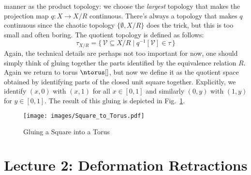 \documentclass[oneside]{book}                                                  %
\begin{document}
                manner as the product topology: we choose the \textit{largest}
                topology that makes the projection map $q:X\rightarrow{X}/R$
                continuous. There's always a topology that makes $q$ continuous
                since the chaotic topology $\{\emptyset,X/R\}$ does the trick,
                but this is too small and often boring. The quotient topology is
                defined as follows:
                \begin{equation}
                    \tau_{X/R}=\{\,\mathcal{V}\subseteq{X}/R\;|\;
                        q^{\minus{1}}[\mathcal{V}]\in\tau\,\}
                \end{equation}
                Again, the technical details are perhaps not too important for
                now, one should simply think of gluing together the parts
                identified by the equivalence relation $R$. Again we return to
                torus $\ntorus[]$, but now we define it as the quotient space
                obtained by identifying parts of the closed unit square
                together. Explicitly, we identify $(x,0)$ with $(x,1)$ for all
                $x\in[0,1]$ and similarly $(0,y)$ with $(1,y)$ for $y\in[0,1]$.
                The result of this gluing is depicted in
                Fig.~\ref{fig:Square_to_Torus}.
                \begin{figure}[H]
                    \centering
                    \captionsetup{type=figure}
                    \texttt{[image: images/Square\_to\_Torus.pdf]}
                    \caption{Gluing a Square into a Torus}
                    \label{fig:Square_to_Torus}
                \end{figure}
        \section{Lecture 2: Deformation Retractions}
\end{document}
